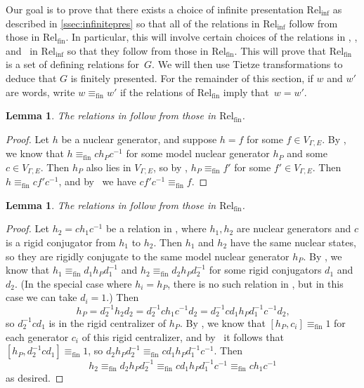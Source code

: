 \documentclass[11pt,letterpaper]{amsart}
\newtheorem{lemma}[theorem]{Lemma}
\theoremstyle{definition}
\newcommand{\Rel}{\mathrm{Rel}}
\begin{document}
Our goal is to prove that there exists a choice of infinite presentation $\Rel_{\mathrm{inf}}$ as described in \cref{ssec:infinitepres} so that all of the relations in $\Rel_{\mathrm{inf}}$ follow from those in $\Rel_{\mathrm{fin}}$.  In particular, this will involve certain choices of the relations in \Refine, \Inv, and \Prod\  in $\Rel_{\mathrm{inf}}$ so that they follow from those in $\Rel_{\mathrm{fin}}$.  This will prove that $\Rel_{\mathrm{fin}}$ is a set of defining relations for~$G$.  We will then use Tietze transformations to deduce that $G$ is finitely presented.
\newcommand{\eqfin}{\equiv_{\mathrm{fin}}}%
For the remainder of this section, if $w$ and $w'$ are words, write $w\eqfin w'$ if the relations of $\Rel_{\mathrm{fin}}$ imply that~$w=w'$.

\begin{lemma}\label{lem:HaveVNuc}
The relations in\/ {\normalfont\VNuc} follow from those in\/ $\Rel_{\mathrm{fin}}$.
\end{lemma}
\begin{proof}
Let $h$ be a nuclear generator, and suppose $h=f$ for some $f\in V_{\Gamma,E}$.  By \Model, we know that $h\eqfin ch_Pc^{-1}$ for some model nuclear generator $h_P$ and some $c\in V_{\Gamma,E}$.  Then $h_P$ also lies in $V_{\Gamma,E}$, so by \VNucFin, $h_P\eqfin f'$ for some $f'\in V_{\Gamma,E}$.  Then $h\eqfin cf'c^{-1}$, and by \VRel\ we have $cf'c^{-1}\eqfin f$.
\end{proof}

\begin{lemma}\label{lem:HaveConj}
The relations in\/ {\normalfont\Conj} follow from those in\/ $\Rel_{\mathrm{fin}}$.
\end{lemma}
\begin{proof}
Let $h_2=ch_1c^{-1}$ be a relation in \Conj, where $h_1,h_2$ are nuclear generators and $c$ is a rigid conjugator from $h_1$ to $h_2$.  Then $h_1$ and $h_2$ have the same nuclear states, so they are rigidly conjugate to the same model nuclear generator $h_P$.  By \Model, we know that $h_1\eqfin d_1h_Pd_1^{-1}$ and $h_2\eqfin d_2h_Pd_2^{-1}$ for some rigid conjugators $d_1$ and $d_2$. (In the special case where $h_i=h_P$, there is no such relation in \Model, but in this case we can take $d_i=1$.) Then
\[
h_P = d_2^{-1}h_2d_2 = d_2^{-1}ch_1c^{-1}d_2 = d_2^{-1}cd_1h_Pd_1^{-1}c^{-1}d_2 \text{,}
\]
so $d_2^{-1}cd_1$ is in the rigid centralizer of $h_P$.  By \CentConjFin, we know that $[h_P,c_i]\eqfin 1$ for each generator $c_i$ of this rigid centralizer, and by \VRel\ it follows that $[h_P,d_2^{-1}cd_1]\eqfin 1$, so $d_2h_Pd_2^{-1}\eqfin cd_1h_Pd_1^{-1}c^{-1}$.  Then
\[
h_2 \eqfin d_2h_Pd_2^{-1} \eqfin cd_1h_Pd_1^{-1}c^{-1}
\eqfin  
ch_1c^{-1}
\]
as desired.
\end{proof}
\end{document}
